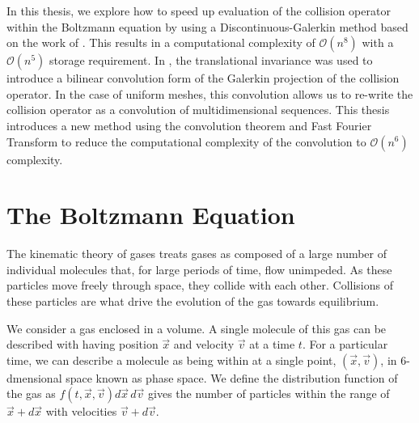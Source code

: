 \documentclass[12pt]{CSUNthesis}
\begin{document}
In this thesis, we explore how to speed up evaluation of the collision operator within the Boltzmann equation by using a Discontinuous-Galerkin method based on the work of \cite{Majorana2011,AlekseenkoJosyula2012,AlekseenkoJosyula2012a,GambaZhang2014}. This results in a computational complexity of $\mathcal{O}(n^8)$ with a $\mathcal{O}(n^5)$ storage requirement. In \cite{AlekseenkoNguyenWood2015}, the translational invariance was used to introduce a bilinear convolution form of the Galerkin projection of the collision operator. In the case of uniform meshes, this convolution allows us to re-write the collision operator as a convolution of multidimensional sequences. This thesis introduces a new method using the convolution theorem and Fast Fourier Transform to reduce the computational complexity of the convolution to $\mathcal{O}(n^6)$ complexity.

\chapter{The Boltzmann Equation}
\label{Chap2}

	The kinematic theory of gases treats gases as composed of a large number of individual molecules that, for large periods of time, flow unimpeded. As these particles move freely through space, they collide with each other. Collisions of these particles are what drive the evolution of the gas towards equilibrium.
	
	We consider a gas enclosed in a volume. A single molecule of this gas can be described with having position $\vec{x}$ and velocity $\vec{v}$ at a time $t$. For a particular time, we can describe a molecule as being within at a single point, $(\vec{x},\vec{v})$, in 6-dmensional space known as phase space. We define the distribution function of the gas as $f(t,\vec{x},\vec{v})d\vec{x}\,d\vec{v}$ gives the number of particles within the range of $\vec{x} + d\vec{x}$ with velocities $\vec{v} + d\vec{v}$. 
\end{document}
